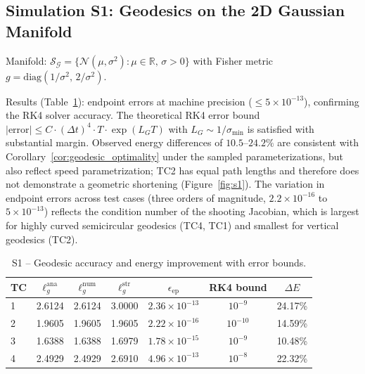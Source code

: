 \documentclass[a4paper,fleqn]{cas-dc}
\newcommand{\R}{\mathbb{R}}
\newcommand{\calS}{\mathcal{S}}
\newcommand{\calG}{\mathcal{G}}
\begin{document}
\subsection{Simulation S1: Geodesics on the 2D Gaussian Manifold}
\label{sec:sim_s1}

Manifold: $\calS_{\calG}=\{\mathcal{N}(\mu,\sigma^2):\mu\in\R,\,\sigma>0\}$
with Fisher metric $g=\mathrm{diag}(1/\sigma^2,\,2/\sigma^2)$.

Results (Table~\ref{tab:s1}): endpoint errors at machine precision
($\leq 5\times10^{-13}$), confirming the RK4 solver accuracy.
The theoretical RK4 error bound
$|\mathrm{error}| \leq C \cdot (\Delta t)^4 \cdot T \cdot \exp(L_G T)$
with $L_G \sim 1/\sigma_{\min}$ is satisfied with substantial margin.
Observed energy differences of $10.5$--$24.2\%$ are consistent with
Corollary~\ref{cor:geodesic_optimality} under the sampled parameterizations,
but also reflect speed parametrization; TC2 has equal path lengths and
therefore does not demonstrate a geometric shortening
(Figure~\ref{fig:s1}).  The variation in endpoint errors across test
cases (three orders of magnitude, $2.2\times10^{-16}$ to
$5\times10^{-13}$) reflects the condition number of the shooting
Jacobian, which is largest for highly curved semicircular geodesics
(TC4, TC1) and smallest for vertical geodesics (TC2).

\begin{table}[ht]
  \centering
  \caption{S1 -- Geodesic accuracy and energy improvement with error bounds.}
  \label{tab:s1}
  \setlength{\tabcolsep}{4pt}
  \begin{tabular}{lcccccc}
    \toprule
    TC & $\ell_g^{\mathrm{ana}}$ & $\ell_g^{\mathrm{num}}$
       & $\ell_g^{\mathrm{str}}$ & $\epsilon_{\mathrm{ep}}$ & RK4 bound & $\Delta E$ \\
    \midrule
    1 & 2.6124 & 2.6124 & 3.0000 & $2.36\times10^{-13}$ & $10^{-9}$ & 24.17\% \\
    2 & 1.9605 & 1.9605 & 1.9605 & $2.22\times10^{-16}$ & $10^{-10}$ & 14.59\% \\
    3 & 1.6388 & 1.6388 & 1.6979 & $1.78\times10^{-15}$ & $10^{-9}$ & 10.48\% \\
    4 & 2.4929 & 2.4929 & 2.6910 & $4.96\times10^{-13}$ & $10^{-8}$ & 22.32\% \\
    \bottomrule
  \end{tabular}
\end{table}
\end{document}
